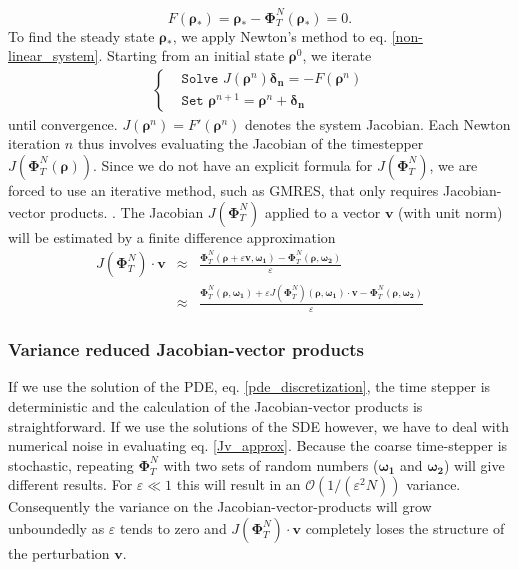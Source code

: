 \documentclass[]{article}
\newcommand{\R}{\ensuremath{\mathbb{R}}} %
\newcommand{\U}{\ensuremath{\boldsymbol{\rho}}}
\newcommand{\cts}{\ensuremath{\boldsymbol{\Phi}^N_T}} %
\newcommand{\V}{\ensuremath{\mathbf{v}}}
\theoremstyle{definition}
\begin{document}
\begin{equation}
  {F}(\U_*) = \U_* - \cts(\U_*) =0. \label{non-linear_system}
\end{equation}
To find the steady state $\U_*$, we apply Newton's method to eq. \ref{non-linear_system}. Starting from an initial state $\U^0$, we iterate %
\begin{eqnarray}
\begin{cases}
& \texttt{Solve         }  J(\U^n) \boldsymbol{\delta_n}  =  - {F}(\U^n) \label{linear_system}        \\          
& \texttt{Set     } \U^{n+1} = \U^n+ \boldsymbol{\delta_n} 
\end{cases}
\end{eqnarray}
until convergence. 
$J(\U^n) =   F'(\U^n)  $ denotes the system Jacobian. Each Newton iteration $n$ thus involves evaluating the Jacobian of the timestepper $J(\cts(\U))$.
Since we do not have an explicit formula for $J(\cts)$, we are forced to use an iterative method, such as GMRES, that only requires Jacobian-vector products. %
 \cite{Brown_Krylov}.
The Jacobian $J(\cts)$ applied to a vector $\mathbf{v}$ (with unit norm) will be estimated by a finite difference approximation
\begin{eqnarray}
\label{Jv_approx}
J(\cts) \cdot \mathbf{v} &\approx& \frac{\cts (\U + \varepsilon \mathbf{v}, \boldsymbol{\omega_1} )  - \cts (\U, \boldsymbol{\omega_2})}{\varepsilon} \\
&\approx & \frac{\cts (\U, \boldsymbol{\omega_1} )  + \varepsilon J(\cts) (  \U, \boldsymbol{\omega_1})  \cdot \mathbf{v}  - \cts (\U, \boldsymbol{\omega_2}) }{\varepsilon} \nonumber
\end{eqnarray}

\subsubsection{Variance reduced Jacobian-vector products}

If we use the solution of the PDE, eq. \eqref{pde_discretization}, the time stepper is deterministic and the calculation of the Jacobian-vector products is straightforward. If we use the solutions of the SDE however, we have to deal with numerical noise in evaluating eq. \ref{Jv_approx}.
Because the coarse time-stepper is stochastic, repeating $\cts$ with two sets of random numbers ($\boldsymbol{\omega_1}$ and $ \boldsymbol{\omega_2}$)  will give different results. For $ \varepsilon \ll 1$ this will result in an $\mathcal{O}(1/(\varepsilon^2 N))$ variance. Consequently the variance on the Jacobian-vector-products will grow unboundedly as $\varepsilon$ tends to zero and $J(\cts) \cdot \mathbf{v}$ completely loses the structure of the perturbation \V.
\end{document}
